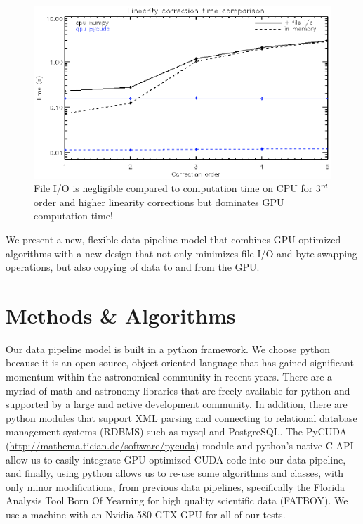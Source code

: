 \begin{figure}[!ht]
\includegraphics{part4/Warner_O31/O31_f1.eps}
\caption{File I/O is negligible compared to computation time on CPU for 3$^{rd}$ order and higher linearity corrections but dominates GPU computation time!}
\end{figure}

We present a new, flexible data pipeline model that combines GPU-optimized algorithms with a new design that not only minimizes file I/O and byte-swapping operations, but also copying of data to and from the GPU. 

\section{Methods \& Algorithms}

Our data pipeline model is built in a python framework.  We choose python because it is an open-source, object-oriented language that has gained significant momentum within the astronomical community in recent years. There are a myriad of math and astronomy libraries that are freely available for python and supported by a large and active development community.  In addition, there are python modules that support XML parsing and connecting to relational database management systems (RDBMS) such as mysql and PostgreSQL.  The PyCUDA (\url{http://mathema.tician.de/software/pycuda}) module and python's native C-API allow us to easily integrate GPU-optimized CUDA code into our data pipeline, and finally, using python allows us to re-use some algorithms and classes, with only minor modifications, from previous data pipelines, specifically the Florida Analysis Tool Born Of Yearning for high quality scientific data (FATBOY).  We use a machine with an Nvidia 580 GTX GPU for all of our tests.

